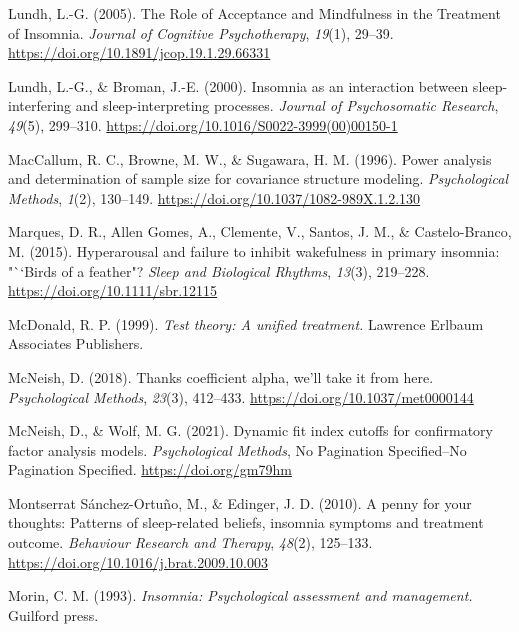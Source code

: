 \documentclass[
  ,doc,11pt, twoside,floatsintext]{apa6}
\newlength{\cslhangindent}
\newlength{\cslentryspacingunit} %
\newenvironment{CSLReferences}[2] %
 {%
  \setlength{\parindent}{0pt}
  \ifodd #1
  \let\oldpar\par
  \def\par{\hangindent=\cslhangindent\oldpar}
  \fi
  \setlength{\parskip}{#2\cslentryspacingunit}
 }%
 {}
\begin{document}
\begin{CSLReferences}{1}{0}
\leavevmode{}%
Lundh, L.-G. (2005). The {Role} of {Acceptance} and {Mindfulness} in the {Treatment} of {Insomnia}. \emph{Journal of Cognitive Psychotherapy}, \emph{19}(1), 29--39. \url{https://doi.org/10.1891/jcop.19.1.29.66331}

\leavevmode{}%
Lundh, L.-G., \& Broman, J.-E. (2000). Insomnia as an interaction between sleep-interfering and sleep-interpreting processes. \emph{Journal of Psychosomatic Research}, \emph{49}(5), 299--310. \url{https://doi.org/10.1016/S0022-3999(00)00150-1}

\leavevmode{}%
MacCallum, R. C., Browne, M. W., \& Sugawara, H. M. (1996). Power analysis and determination of sample size for covariance structure modeling. \emph{Psychological Methods}, \emph{1}(2), 130--149. \url{https://doi.org/10.1037/1082-989X.1.2.130}

\leavevmode{}%
Marques, D. R., Allen Gomes, A., Clemente, V., Santos, J. M., \& Castelo-Branco, M. (2015). Hyperarousal and failure to inhibit wakefulness in primary insomnia: "``Birds of a feather"? \emph{Sleep and Biological Rhythms}, \emph{13}(3), 219--228. \url{https://doi.org/10.1111/sbr.12115}

\leavevmode{}%
McDonald, R. P. (1999). \emph{Test theory: A unified treatment.} Lawrence Erlbaum Associates Publishers.

\leavevmode{}%
McNeish, D. (2018). Thanks coefficient alpha, we'll take it from here. \emph{Psychological Methods}, \emph{23}(3), 412--433. \url{https://doi.org/10.1037/met0000144}

\leavevmode{}%
McNeish, D., \& Wolf, M. G. (2021). Dynamic fit index cutoffs for confirmatory factor analysis models. \emph{Psychological Methods}, No Pagination Specified--No Pagination Specified. \url{https://doi.org/gm79hm}

\leavevmode{}%
Montserrat Sánchez-Ortuño, M., \& Edinger, J. D. (2010). A penny for your thoughts: {Patterns} of sleep-related beliefs, insomnia symptoms and treatment outcome. \emph{Behaviour Research and Therapy}, \emph{48}(2), 125--133. \url{https://doi.org/10.1016/j.brat.2009.10.003}

\leavevmode{}%
Morin, C. M. (1993). \emph{Insomnia: Psychological assessment and management.} Guilford press.


\end{CSLReferences}
\end{document}
